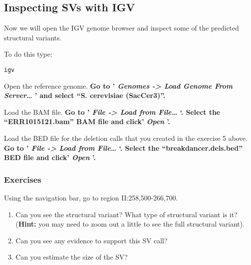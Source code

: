 \documentclass[11pt]{article}
\makeatletter
\newcommand{\boxspacing}{\kern\kvtcb@left@rule\kern\kvtcb@boxsep}
\newcommand{\prompt}[4]{
        {\ttfamily\llap{{\color{blue}\LARGE\faKeyboardO\hspace{3pt}#4}}\vspace{-\baselineskip}}
    }
\makeatother
\begin{document}
    \hypertarget{inspecting-svs-with-igv}{%
\subsection{Inspecting SVs with IGV}\label{inspecting-svs-with-igv}}

Now we will open the IGV genome browser and inspect some of the
predicted structural variants.

To do this type:

    \begin{tcolorbox}[breakable, size=fbox, boxrule=1pt, pad at break*=1mm,colback=cellbackground, colframe=cellborder]
\prompt{In}{incolor}{ }{\boxspacing}
\begin{Verbatim}[commandchars=\\\{\}]
igv
\end{Verbatim}
\end{tcolorbox}

    Open the reference genome. \textbf{Go to ' \textit{Genomes -\textgreater{}
Load Genome From Server\ldots{}} ' and select ``S. cerevisiae
(SacCer3)''.}

Load the BAM file. \textbf{Go to ' \textit{File -\textgreater{} Load from
File\ldots{}} `. Select the ``ERR1015121.bam'' BAM file and click'
\textit{Open} '.}

Load the BED file for the deletion calls that you created in the
exercise 5 above. \textbf{Go to ' \textit{File -\textgreater{} Load from
File\ldots{}} `. Select the ``breakdancer.dels.bed'' BED file and click'
\textit{Open} '.}

\hypertarget{exercises}{%
\subsubsection{Exercises}\label{exercises}}

Using the navigation bar, go to region II:258,500-266,700.

\begin{enumerate}
\def\labelenumi{\arabic{enumi}.}
\item
  Can you see the structural variant? What type of structural variant is
  it? (\textbf{Hint:} you may need to zoom out a little to see the full
  structural variant).
\item
  Can you see any evidence to support this SV call?
\item
  Can you estimate the size of the SV?
\end{enumerate}
\end{document}
